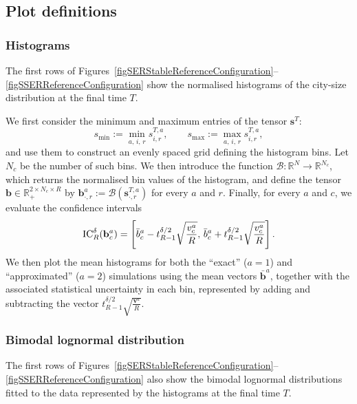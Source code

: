 \documentclass[a4paper]{article}
\newcommand{\R}{\mathbb{R}}
\begin{document}
\subsection{Plot definitions}
\label{apxPlotDefinitions}
%
\subsubsection{Histograms}
The first rows of Figures~\ref{figSERStableReferenceConfiguration}--\ref{figSSERReferenceConfiguration} show the normalised histograms of the city-size distribution at the final time $T$.

We first consider the minimum and maximum entries of the tensor $\mathbf s^T$:
$$ s_{\min}:=\min_{a,\,i,\,r}s^{T,a}_{i,r}, \qquad s_{\max}:=\max_{a,\,i,\,r}s^{T,a}_{i,r}, $$
and use them to construct an evenly spaced grid defining the histogram bins. Let $N_c$ be the number of such bins. We then introduce the function $\mathcal{B}:\R^N\to\R^{N_c}$, which returns the normalised bin values of the histogram, and define the tensor $\mathbf b\in\R_+^{2\times N_c\times R}$ by $\mathbf b^a_{\cdot,r}:=\mathcal{B}(\mathbf s^{T,a}_{\cdot,r})$ for every $a$ and $r$. Finally, for every $a$ and $c$, we evaluate the confidence intervals
$$ \operatorname{IC}_R^\delta(\mathbf b^a_c)=\left[\bar{b}^a_c-t^{\delta/2}_{R-1}\sqrt{\frac{v^a_c}{R}},\,\bar{b}^a_c+t^{\delta/2}_{R-1}\sqrt{\frac{v^a_c}{R}}\right]. $$
We then plot the mean histograms for both the ``exact'' ($a=1$) and ``approximated'' ($a=2$) simulations using the mean vectors $\bar{\mathbf b}^a$, together with the associated statistical uncertainty in each bin, represented by adding and subtracting the vector $t^{\delta/2}_{R-1}\sqrt{\frac{\mathbf v^a}{R}}$.

\subsubsection{Bimodal lognormal distribution}
The first rows of Figures~\ref{figSERStableReferenceConfiguration}--\ref{figSSERReferenceConfiguration} also show the bimodal lognormal distributions fitted to the data represented by the histograms at the final time $T$.
\end{document}
